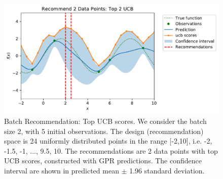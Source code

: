 \begin{figure}[t]
    \centering
    \includegraphics[scale=0.6]{plots/Recommend_2_Data_Points:_Top_2_UCB.pdf}
    \caption{Batch Recommendation: Top UCB scores. We consider the batch size 2, with 5 initial observations. The design (recommendation) space is 24 uniformly distributed points in the range [-2,10], i.e. {-2, -1.5, -1, ..., 9.5, 10}. The recommendations are 2 data points with top UCB scores, constructed with GPR predictions. The confidence interval are shown in predicted mean $\pm$ 1.96 standard deviation. }
    \label{fig: Top UCB rec.}
\end{figure}

